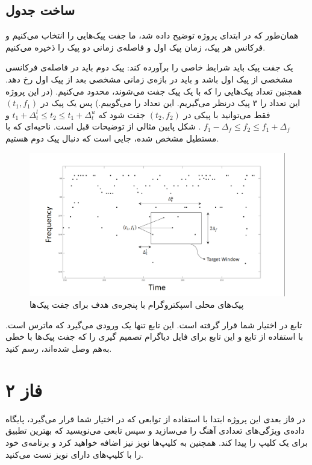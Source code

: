 \documentclass{utsignal}
\begin{document}
	\subsection{ساخت جدول} \label{ssec:construct-table}
	همان‌طور که در ابتدای پروژه توضیح داده شد، ما جفت پیک‌هایی را انتخاب می‌کنیم و فرکانس هر پیک، زمان پیک اول و فاصله‌ی زمانی دو پیک را ذخیره می‌کنیم.
	
	یک جفت پیک باید شرایط خاصی را برآورده کند: پیک دوم باید در فاصله‌ی فرکانسی مشخصی از پیک اول باشد و باید در بازه‌ی زمانی مشخصی بعد از پیک اول رخ دهد. همچنین تعداد پیک‌هایی را که با یک پیک جفت می‌شوند، محدود می‌کنیم. (در این پروژه این تعداد را ۳ پیک درنظر می‌گیریم. این تعداد را  می‌گوییم.) پس یک پیک در $(t_1, f_1)$ فقط می‌توانید با پیکی در $(t_2, f_2)$ جفت شود که $t_1+\Delta_t^l \le t_2 \le t_1+\Delta_t^u$ و 	$f_1 - \Delta_f \le f_2 \le f_1+\Delta_f$  . شکل پایین مثالی از توضیحات قبل است. ناحیه‌ای که با مستطیل مشخص شده، جایی است که دنبال پیک دوم هستیم.
	\begin{figure}[h]
		\includegraphics[width=\linewidth]{constellation-map.png}
		\caption{پیک‌های محلی اسپکتروگرام با پنجره‌ی هدف برای جفت پیک‌ها}
	\end{figure}
	
	تابع  در اختیار شما قرار گرفته است. این تابع تنها یک ورودی می‌گیرد که ماترس  است. با استفاده از تابع  و این تابع برای فایل  دیاگرام تصمیم گیری را که جفت پیک‌ها با خطی به‌هم وصل شده‌اند، رسم کنید.
	 
	\section*{فاز ۲}
	در فاز بعدی این پروژه ابتدا با استفاده از توابعی که در اختیار شما قرار می‌گیرد، پایگاه داده‌ی ویژگی‌های تعدادی آهنگ را می‌سازید و سپس تابعی می‌نویسید که بهترین تطبیق برای یک کلیپ را پیدا کند. همچنین به کلیپ‌ها نویز نیز اضافه خواهید کرد و برنامه‌ی خود را با کلیپ‌های دارای نویز تست می‌کنید.
\end{document}
